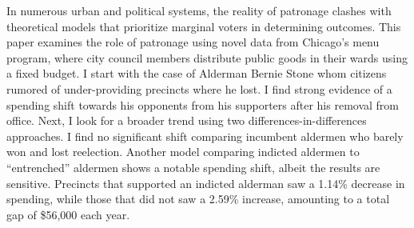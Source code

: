 \begin{spacing}{1.0}
    In numerous urban and political systems, the reality of patronage clashes with theoretical models that prioritize marginal voters in determining outcomes.
    This paper examines the role of patronage using novel data from Chicago's menu program, where city council members distribute public goods in their wards using a fixed budget.
    I start with the case of Alderman Bernie Stone whom citizens rumored of under-providing precincts where he lost.
    I find strong evidence of a spending shift towards his opponents from his supporters after his removal from office.
    Next, I look for a broader trend using two differences-in-differences approaches.
    I find no significant shift comparing incumbent aldermen who barely won and lost reelection.
    Another model comparing indicted aldermen to ``entrenched'' aldermen shows a notable spending shift, albeit the results are sensitive. 
    Precincts that supported an indicted alderman saw a 1.14\% decrease in spending, while those that did not saw a 2.59\% increase, amounting to a total gap of \$56,000 each year. 
\end{spacing}
